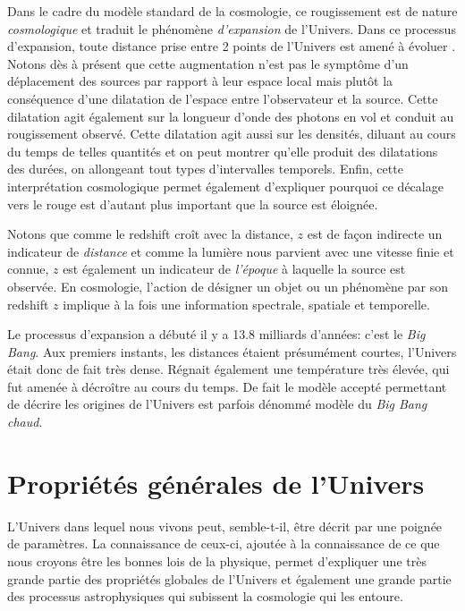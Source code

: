 Dans le cadre du modèle standard de la cosmologie, ce rougissement est de nature \textit{cosmologique} et traduit le phénomène \textit{d'expansion} de l'Univers. Dans ce processus d'expansion, toute distance prise entre 2 points de l'Univers est amené à évoluer . Notons dès à présent que cette augmentation n'est pas le symptôme d'un déplacement des sources par rapport à leur espace local mais plutôt la conséquence d'une dilatation de l'espace entre l'observateur et la source. Cette dilatation agit également sur la longueur d'onde des photons en vol et conduit au rougissement observé. Cette dilatation agit aussi sur les densités, diluant au cours du temps de telles quantités et on peut montrer qu'elle produit des dilatations des durées, on allongeant tout types d'intervalles temporels. Enfin, cette interprétation cosmologique permet également d'expliquer pourquoi ce décalage vers le rouge est d'autant plus important que la source est éloignée.

Notons que comme le redshift croît avec la distance, $z$ est de façon indirecte un indicateur de \textit{distance} et comme la lumière nous parvient avec une vitesse finie et connue, $z$ est également un indicateur de \textit{l'époque} à laquelle la source est observée. En cosmologie, l'action de désigner un objet ou un phénomène par son redshift $z$ implique à la fois une information spectrale, spatiale et temporelle.

Le processus d'expansion a débuté il y a 13.8 milliards d'années: c'est le \textit{Big Bang}. Aux premiers instants, les distances étaient présumément courtes, l'Univers était donc de fait très dense. Régnait également une température très élevée, qui fut amenée à décroître au cours du temps. De fait le modèle accepté permettant de décrire les origines de l'Univers est parfois dénommé modèle du \textit{Big Bang chaud}.

\section{Propriétés générales de l'Univers}
L'Univers dans lequel nous vivons peut, semble-t-il, être décrit par une poignée de paramètres. La connaissance de ceux-ci, ajoutée à la connaissance de ce que nous croyons être les bonnes lois de la physique, permet d'expliquer une très grande partie des propriétés globales de l'Univers et également une grande partie des processus astrophysiques qui subissent la cosmologie qui les entoure.  

